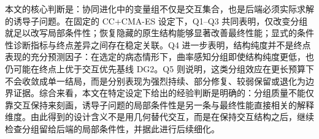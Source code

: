 本文的核心判断是：协同进化中的变量组不仅是交互集合，也是后端必须实际求解的诱导子问题。在固定的 CC+CMA-ES 设定下，Q1--Q3 共同表明，仅改变分组就足以改写局部条件性；恢复隐藏的原生结构能够显著改善最终性能；显式的条件性诊断指标与终点差异之间存在稳定关联。Q4 进一步表明，结构纯度并不是终点表现的充分预测因子：在选定的病态情形下，曲率感知分组即使结构纯度更低，也仍可能在终点上优于交互优先基线 DG2。Q5 则说明，这类分组效应在更长预算下不会收敛成单一结局，而是分别表现为强烈持续、部分修复、较弱保留或退化为边界证据。综合来看，本文在特定设定下给出的经验判断是明确的：分组质量不能仅靠交互保持来刻画，诱导子问题的局部条件性是另一条与最终性能直接相关的解释维度。由此得到的设计含义不是用几何替代交互，而是在保持交互结构之后，继续检查分组留给后端的局部条件性，并据此进行后续细化。

